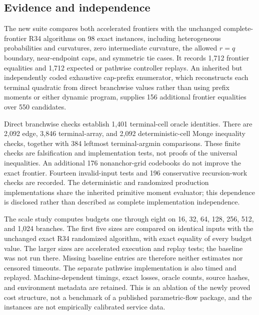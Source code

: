\subsection{Evidence and independence}
The new suite compares both accelerated frontiers with the unchanged complete-frontier R34 algorithms on 98 exact instances, including heterogeneous probabilities and curvatures, zero intermediate curvature, the allowed $r=q$ boundary, near-endpoint caps, and symmetric tie cases. It records 1,712 frontier equalities and 1,712 expected or pathwise controller replays. An inherited but independently coded exhaustive cap-prefix enumerator, which reconstructs each terminal quadratic from direct branchwise values rather than using prefix moments or either dynamic program, supplies 156 additional frontier equalities over 550 candidates.

Direct branchwise checks establish 1,401 terminal-cell oracle identities. There are 2,092 edge, 3,846 terminal-array, and 2,092 deterministic-cell Monge inequality checks, together with 384 leftmost terminal-argmin comparisons. These finite checks are falsification and implementation tests, not proofs of the universal inequalities. An additional 176 nonanchor-grid codebooks do not improve the exact frontier. Fourteen invalid-input tests and 196 conservative recursion-work checks are recorded. The deterministic and randomized production implementations share the inherited primitive moment evaluator; this dependence is disclosed rather than described as complete implementation independence.

The scale study computes budgets one through eight on 16, 32, 64, 128, 256, 512, and 1,024 branches. The first five sizes are compared on identical inputs with the unchanged exact R34 randomized algorithm, with exact equality of every budget value. The larger sizes are accelerated execution and replay tests; the baseline was not run there. Missing baseline entries are therefore neither estimates nor censored timeouts. The separate pathwise implementation is also timed and replayed. Machine-dependent timings, exact losses, oracle counts, source hashes, and environment metadata are retained. This is an ablation of the newly proved cost structure, not a benchmark of a published parametric-flow package, and the instances are not empirically calibrated service data.
